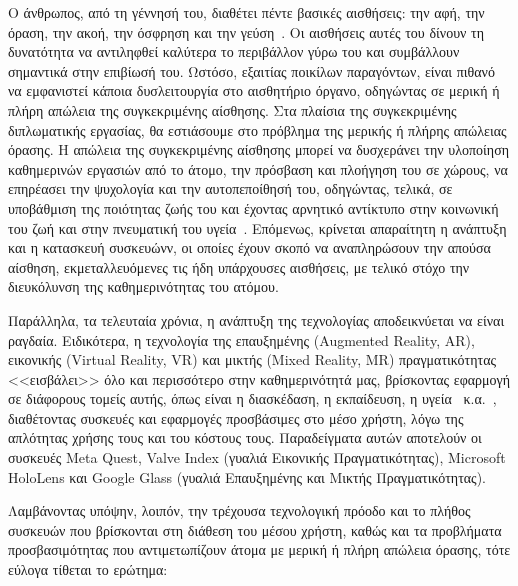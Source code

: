 
\setlength{\parindent}{24pt}
Ο άνθρωπος, από τη γέννησή του, διαθέτει πέντε βασικές αισθήσεις: την αφή, την όραση, την ακοή, την όσφρηση και την γεύση~\cite{bradford_2017_the}. Οι αισθήσεις αυτές του δίνουν τη δυνατότητα να αντιληφθεί καλύτερα το περιβάλλον γύρω του και συμβάλλουν σημαντικά στην επιβίωσή του. Ωστόσο, εξαιτίας ποικίλων παραγόντων, είναι πιθανό να εμφανιστεί κάποια δυσλειτουργία στο αισθητήριο όργανο, οδηγώντας σε μερική ή πλήρη απώλεια της συγκεκριμένης αίσθησης. Στα πλαίσια της συγκεκριμένης διπλωματικής εργασίας, θα εστιάσουμε στο πρόβλημα της μερικής ή πλήρης απώλειας όρασης. Η απώλεια της συγκεκριμένης αίσθησης μπορεί να δυσχεράνει την υλοποίηση καθημερινών εργασιών από το άτομο, την πρόσβαση και πλοήγηση του σε χώρους, να επηρέασει την ψυχολογία και την αυτοπεποίθησή του, οδηγώντας, τελικά, σε υποβάθμιση της ποιότητας ζωής του και έχοντας αρνητικό αντίκτυπο στην κοινωνική του ζωή και στην πνευματική του υγεία~\cite{worldhealthorganization_2023_blindness,maaikelangelaan_2007_quality}. Επόμενως, κρίνεται απαραίτητη η ανάπτυξη και η κατασκευή συσκευώνν, οι οποίες έχουν σκοπό να αναπληρώσουν την απούσα αίσθηση, εκμεταλλευόμενες τις ήδη υπάρχουσες αισθήσεις, με τελικό στόχο την διευκόλυνση της καθημερινότητας του ατόμου.

Παράλληλα, τα τελευταία χρόνια, η ανάπτυξη της τεχνολογίας αποδεικνύεται να είναι ραγδαία. Ειδικότερα, η τεχνολογία της επαυξημένης (Augmented Reality, AR), εικονικής (Virtual Reality, VR) και μικτής (Mixed Reality, MR) πραγματικότητας <<εισβάλει>> όλο και περισσότερο στην καθημερινότητά μας, βρίσκοντας εφαρμογή σε διάφορους τομείς αυτής, όπως είναι η διασκέδαση, η εκπαίδευση, η υγεία~\cite{morgan_2021_the} κ.α.~\cite{wikipediacontributors_2019_mixed}, διαθέτοντας συσκευές και εφαρμογές προσβάσιμες στο μέσο χρήστη, λόγω της απλότητας χρήσης τους και του κόστους τους. Παραδείγματα αυτών αποτελούν οι συσκευές Meta Quest, Valve Index (γυαλιά Εικονικής Πραγματικότητας), Microsoft HoloLens και Google Glass (γυαλιά Επαυξημένης και Μικτής Πραγματικότητας). %

Λαμβάνοντας υπόψην, λοιπόν, την τρέχουσα τεχνολογική πρόοδο και το πλήθος συσκευών που βρίσκονται στη διάθεση του μέσου χρήστη, καθώς και τα προβλήματα προσβασιμότητας που αντιμετωπίζουν άτομα με μερική ή πλήρη απώλεια όρασης, τότε εύλογα τίθεται το ερώτημα:


